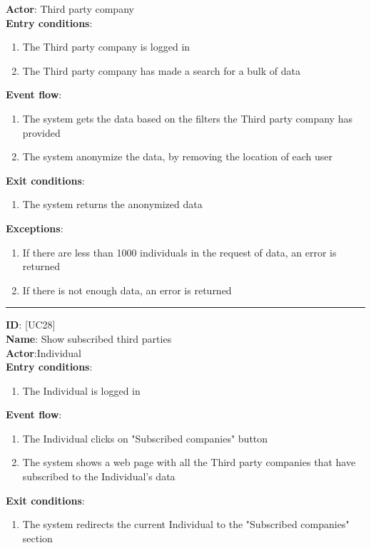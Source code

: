 \documentclass[a4paper, hidelinks, 12pt]{report}
\newcommand\usecase[1]{ [UC#1] }
\begin{document}
\begin{itemize}
		\textbf{Actor}: Third party company \\
		\textbf{Entry conditions}:
		\begin{enumerate}
			\item{The Third party company is logged in}
			\item{The Third party company has made a search for a bulk of data}
		\end{enumerate}
		\textbf{Event flow}:
		\begin{enumerate}
			\item{The system gets the data based on the filters the Third party company has provided}
			\item{The system anonymize the data, by removing the location of each user}
		\end{enumerate}
		\textbf{Exit conditions}:
		\begin{enumerate}
			\item{The system returns the anonymized data}
		\end{enumerate}
		\textbf{Exceptions}:
		\begin{enumerate}
			\item{If there are less than 1000 individuals in the request of data, an error is returned}
			\item{If there is not enough data, an error is returned}
  		\end{enumerate}
		\rule{\linewidth}{0.4pt}
		\textbf{ID}: \usecase{28} \\
		\textbf{Name}: Show subscribed third parties \\
		\textbf{Actor}:Individual \\
		\textbf{Entry conditions}:
    		\begin{enumerate}
			\item{The Individual is logged in}
  		\end{enumerate}
		\textbf{Event flow}:
  		\begin{enumerate}
			\item{The Individual clicks on "Subscribed companies" button}
			\item{The system shows a web page with all the Third party companies that have subscribed to the Individual's data}
		\end{enumerate}
		\textbf{Exit conditions}:
		\begin{enumerate}
			\item{The system redirects the current Individual to the "Subscribed companies" section}
		\end{enumerate}

\end{itemize}
\end{document}
